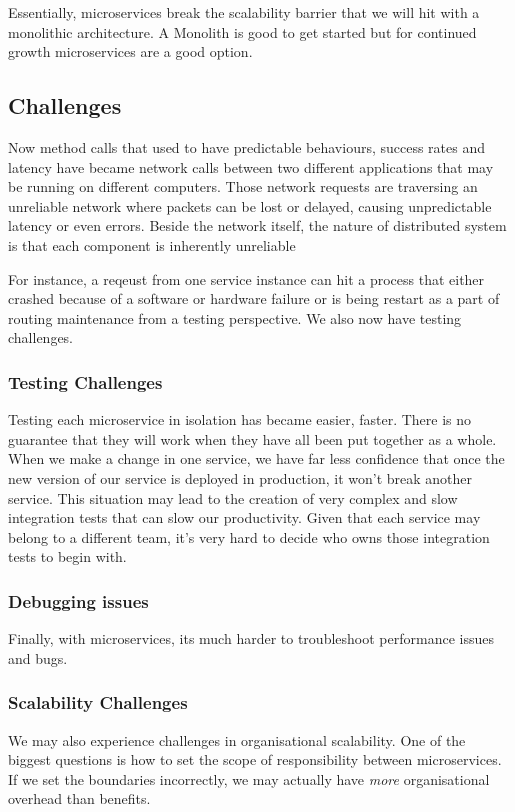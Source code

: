 \documentclass[a4paper, 11pt]{book}
\begin{document}
    Essentially, microservices break the scalability barrier that we will hit with a monolithic architecture. A Monolith is good to get started but for continued growth microservices are a good option.

    \subsection{Challenges}
    Now method calls that used to have predictable behaviours, success rates and latency have became network calls between two different applications that may be running on different computers.
    Those network requests are traversing an unreliable network where packets can be lost or delayed, causing unpredictable latency or even errors.
    Beside the network itself, the nature of distributed system is that each component is inherently unreliable

    For instance, a reqeust from one service instance can hit a process that either crashed because of a software or hardware failure or is being restart as a part of routing maintenance from a testing perspective.
    We also now have testing challenges.

    \subsubsection{Testing Challenges}
    Testing each microservice in isolation has became easier, faster.
    There is no guarantee that they will work when they have all been put together as a whole.
    When we make a change in one service, we have far less confidence that once the new version of our service is deployed in production, it won't break another service.
    This situation may lead to the creation of very complex and slow integration tests that can slow our productivity.
    Given that each service may belong to a different team, it's very hard to decide who owns those integration tests to begin with.

    \subsubsection{Debugging issues}
    Finally, with microservices, its much harder to troubleshoot performance issues and bugs.

    \subsubsection{Scalability Challenges}
    We may also experience challenges in organisational scalability.
    One of the biggest questions is how to set the scope of responsibility between microservices.
    If we set the boundaries incorrectly, we may actually have \textit{more} organisational overhead than benefits.
\end{document}
